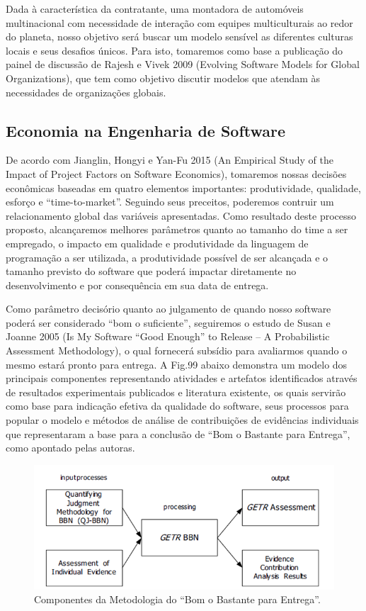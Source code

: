 \documentclass[12pt]{article}
\begin{document}
Dada à característica da contratante, uma montadora de automóveis multinacional com necessidade de interação com equipes multiculturais ao redor do planeta, nosso objetivo será buscar um modelo sensível as diferentes culturas locais e seus desafios únicos. Para isto, tomaremos como base a publicação do painel de discussão de Rajesh e Vivek 2009 (Evolving Software Models for Global Organizations), que tem como objetivo discutir modelos que atendam às necessidades de organizações globais.

\subsection{Economia na Engenharia de Software}

De acordo com Jianglin, Hongyi e Yan-Fu 2015 (An Empirical Study of the Impact of Project Factors on Software Economics), tomaremos nossas decisões econômicas baseadas em quatro elementos importantes: produtividade, qualidade, esforço e “time-to-market”. Seguindo seus preceitos, poderemos contruir um relacionamento global das variáveis apresentadas. Como resultado deste processo proposto, alcançaremos melhores parâmetros quanto ao tamanho do time a ser empregado, o impacto em qualidade e produtividade da linguagem de programação a ser utilizada, a produtividade possível de ser alcançada e o tamanho previsto do software que poderá impactar diretamente no desenvolvimento e por consequência em sua data de entrega.

Como parâmetro decisório quanto ao julgamento de quando nosso software poderá ser considerado “bom o suficiente”, seguiremos o estudo de Susan e Joanne 2005 (Is My Software “Good Enough” to Release – A Probabilistic Assessment Methodology), o qual fornecerá subsídio para avaliarmos quando o mesmo estará pronto para entrega. A Fig.99 abaixo demonstra um modelo dos principais componentes representando atividades e artefatos identificados através de resultados experimentais publicados e literatura existente, os quais servirão como base para indicação efetiva da qualidade do software, seus processos para popular o modelo e métodos de análise de contribuições de evidências individuais que representaram a base para a conclusão de “Bom o Bastante para Entrega”, como apontado pelas autoras.

\begin{figure}[htp]
\centering
\includegraphics[scale=.8] {swebok_economia.png}
\caption{Componentes da Metodologia do “Bom o Bastante para Entrega”.}
\label{fig:exampleFig6}
\end{figure}



\end{document}

